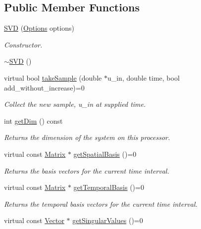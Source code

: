 \subsection*{Public Member Functions}
\begin{DoxyCompactItemize}
\item 
\hyperlink{class_c_a_r_o_m_1_1_s_v_d_a20c7b447885f81e763067da0685d04a4}{S\-V\-D} (\hyperlink{class_c_a_r_o_m_1_1_options}{Options} options)
\begin{DoxyCompactList}\small\item\em Constructor. \end{DoxyCompactList}\item 
\hyperlink{class_c_a_r_o_m_1_1_s_v_d_a4939973d4f9d812c74f6e749d91cc473}{$\sim$\-S\-V\-D} ()
\item 
virtual bool \hyperlink{class_c_a_r_o_m_1_1_s_v_d_a5ed8a558690b130c49c2e923cc625769}{take\-Sample} (double $\ast$u\-\_\-in, double time, bool add\-\_\-without\-\_\-increase)=0
\begin{DoxyCompactList}\small\item\em Collect the new sample, u\-\_\-in at supplied time. \end{DoxyCompactList}\item 
int \hyperlink{class_c_a_r_o_m_1_1_s_v_d_a66e6ad89757a715b8f5d6e01c205feb5}{get\-Dim} () const 
\begin{DoxyCompactList}\small\item\em Returns the dimension of the system on this processor. \end{DoxyCompactList}\item 
virtual const \hyperlink{class_c_a_r_o_m_1_1_matrix}{Matrix} $\ast$ \hyperlink{class_c_a_r_o_m_1_1_s_v_d_ab152d85dfb91958d2265dd54046752dc}{get\-Spatial\-Basis} ()=0
\begin{DoxyCompactList}\small\item\em Returns the basis vectors for the current time interval. \end{DoxyCompactList}\item 
virtual const \hyperlink{class_c_a_r_o_m_1_1_matrix}{Matrix} $\ast$ \hyperlink{class_c_a_r_o_m_1_1_s_v_d_a42820d67808cad0b5cc2af1590b98ff9}{get\-Temporal\-Basis} ()=0
\begin{DoxyCompactList}\small\item\em Returns the temporal basis vectors for the current time interval. \end{DoxyCompactList}\item 
virtual const \hyperlink{class_c_a_r_o_m_1_1_vector}{Vector} $\ast$ \hyperlink{class_c_a_r_o_m_1_1_s_v_d_ab9bbaa07ffc11ef329be712669a6c95b}{get\-Singular\-Values} ()=0

\end{DoxyCompactItemize}
